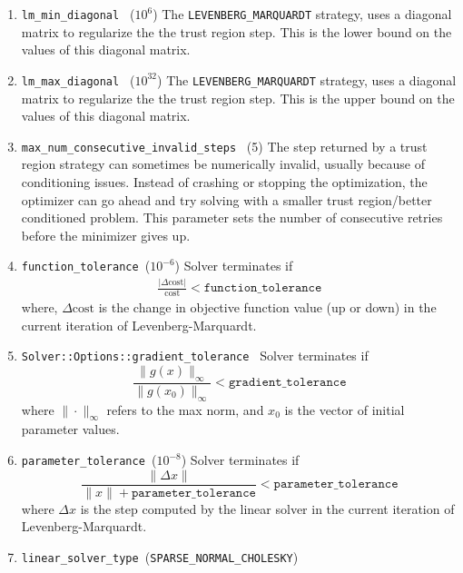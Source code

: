 \begin{enumerate}
\item{\texttt{lm\_min\_diagonal } ($10^6$)} The
  \texttt{LEVENBERG\_MARQUARDT} strategy, uses a diagonal matrix to
  regularize the the trust region step. This is the lower bound on the
  values of this diagonal matrix.

\item{\texttt{lm\_max\_diagonal } ($10^{32}$)}  The
  \texttt{LEVENBERG\_MARQUARDT} strategy, uses a diagonal matrix to
  regularize the the trust region step. This is the upper bound on the
  values of this diagonal matrix.

\item{\texttt{max\_num\_consecutive\_invalid\_steps } (5)} The step
  returned by a trust region strategy can sometimes be numerically
  invalid, usually because of conditioning issues. Instead of crashing
  or stopping the optimization, the optimizer can go ahead and try
  solving with a smaller trust region/better conditioned problem. This
  parameter sets the number of consecutive retries before the
  minimizer gives up.

\item{\texttt{function\_tolerance }}($10^{-6}$) Solver terminates if
\begin{align}
\frac{|\Delta \text{cost}|}{\text{cost}} < \texttt{function\_tolerance}
\end{align}
where, $\Delta \text{cost}$ is the change in objective function value
(up or down) in the current iteration of Levenberg-Marquardt.

\item \texttt{Solver::Options::gradient\_tolerance } Solver terminates if
\begin{equation}
    \frac{\|g(x)\|_\infty}{\|g(x_0)\|_\infty} < \texttt{gradient\_tolerance}
\end{equation}
where $\|\cdot\|_\infty$ refers to the max norm, and $x_0$ is the vector of initial parameter values.

\item{\texttt{parameter\_tolerance }}($10^{-8}$) Solver terminates if
\begin{equation}
    \frac{\|\Delta x\|}{\|x\| + \texttt{parameter\_tolerance}} < \texttt{parameter\_tolerance}
\end{equation}
where $\Delta x$ is the step computed by the linear solver in the current iteration of Levenberg-Marquardt.

\item{\texttt{linear\_solver\_type }(\texttt{SPARSE\_NORMAL\_CHOLESKY})}


\end{enumerate}

